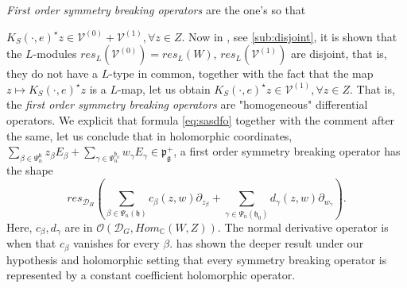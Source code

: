 \documentclass[12pt]{amsart}
\theoremstyle{definition}
\theoremstyle{remark}
\newcommand{\g}{\mathfrak{g}}
\newcommand{\h}{\mathfrak{h}}
\newcommand{\p}{\mathfrak p}
\newcommand{\C}{{\mathbb C}}
\numberwithin{equation}{section}
\begin{document}
{\it First order symmetry breaking operators} are the one's so that

 $K_S(\cdot,e)^\star z \in \mathcal V^{(0)}+ \mathcal V^{(1)}, \forall z \in Z$. Now in \cite[Proposition 1]{OV3}, see \ref{sub:disjoint}, it is shown that the $L$-modules $res_L(\mathcal V^{(0)})=res_L(W)$, $res_L(\mathcal V^{(1)})$ are disjoint, that is, they do not have a $L$-type in common, together with the fact that the map $z \mapsto K_S(\cdot,e)^\star z$ is a $L$-map, let us obtain
 $K_S(\cdot,e)^\star z \in   \mathcal V^{(1)}, \forall z \in Z$. That is, the {\it first order symmetry breaking operators} are "homogeneous" differential operators. We explicit that formula \ref{eq:sasdfo} together with the comment after the same, let us conclude that in holomorphic coordinates, $\sum_{\beta \in \Psi_n^\h} z_\beta E_\beta + \sum_{\gamma \in \Psi_n^{\h_0}} w_\gamma E_\gamma \in \p_\g^+$, a first order symmetry breaking operator has the shape \begin{equation}\label{eq:firstorder}  res_{\mathcal D_H}(\sum_{\beta \in \Psi_n(\h)} c_\beta(z,w)  \partial_{z_\beta} + \sum_{\gamma \in \Psi_n(\h_0)} d_\gamma(z,w) \partial_{w_\gamma} ) . \end{equation} Here, $c_\beta, d_\gamma $ are in  $\mathcal O(\mathcal D_G, Hom_\C( W,Z))$. The normal derivative operator is when  that $c_\beta $ vanishes for every $\beta$. \cite{KP1} has shown the deeper result under our hypothesis and holomorphic setting that every symmetry breaking operator is represented by a constant coefficient holomorphic operator.
\end{document}
